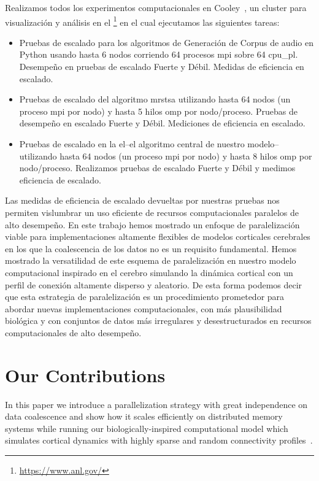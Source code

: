 {Realizamos todos los experimentos computacionales en Cooley~\cite{noauthor_cooley_nodate}, un cluster para visualización y análisis en el  \footnote{\url{https://www.anl.gov/}} en el cual ejecutamos las siguientes tareas: 
\begin{itemize}
\item Pruebas de escalado para los algoritmos de Generación de Corpus de audio en Python usando hasta 6 nodos corriendo 64 procesos \gls{mpi} sobre 64 \gls{cpu_pl}.
Desempeño en pruebas de escalado Fuerte y Débil. Medidas de eficiencia en escalado.
\item Pruebas de escalado del algoritmo \gls{mrstsa} utilizando hasta 64 nodos (un proceso \gls{mpi} por nodo) y hasta 5 hilos \gls{omp} por nodo/proceso.
Pruebas de desempeño en escalado Fuerte y Débil. Mediciones de eficiencia en escalado. 
\item Pruebas de escalado en la \gls{el}--el algoritmo central de nuestro modelo--utilizando hasta 64 nodos (un proceso \gls{mpi} por nodo) y hasta 8 hilos \gls{omp} por nodo/proceso. Realizamos pruebas de escalado Fuerte y Débil y medimos eficiencia de escalado.
\end{itemize}

Las medidas de eficiencia de escalado devueltas por nuestras pruebas nos permiten vislumbrar un uso eficiente de recursos computacionales paralelos de alto desempeño.
En este trabajo hemos mostrado un enfoque de paralelización viable para implementaciones altamente flexibles de modelos corticales cerebrales en los que la coalescencia de los datos no es un requisito fundamental.
Hemos mostrado la versatilidad de este esquema de paralelización en nuestro modelo computacional inspirado en el cerebro simulando la dinámica cortical con un perfil de conexión altamente disperso y aleatorio.
De esta forma podemos decir que esta estrategia de paralelización es un procedimiento prometedor para abordar nuevas implementaciones computacionales, con más plausibilidad biológica y con conjuntos de datos más irregulares y desestructurados en recursos computacionales de alto desempeño.
}{
\section{Our Contributions}

In this paper we introduce a parallelization strategy with great independence on data coalescence and show how it scales efficiently on distributed memory systems while running our biologically-inspired computational model which simulates cortical dynamics with highly sparse and random connectivity profiles~\cite{10.1371/journal.pone.0217966}.

}
